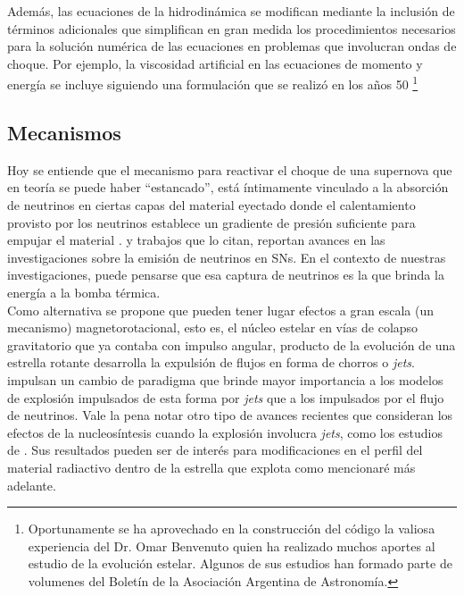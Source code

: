 \documentclass[baaa]{baaa}
\begin{document}
Además, las ecuaciones de la hidrodinámica se modifican mediante la inclusión de términos adicionales que simplifican en gran medida los procedimientos necesarios para la solución numérica de las ecuaciones en problemas que involucran ondas de choque. Por ejemplo, la viscosidad artificial en las ecuaciones de momento y energía se incluye siguiendo una formulación que se realizó en los años 50 \footnote{Oportunamente se ha aprovechado en la construcción del código la valiosa experiencia del Dr. Omar Benvenuto quien ha realizado muchos aportes al estudio de la evolución estelar. Algunos de sus estudios han formado parte de volumenes del Boletín de la Asociación Argentina de Astronomía.}


\subsection{Mecanismos}\label{mech}

Hoy se entiende que el mecanismo para reactivar el choque de una supernova que en teoría se puede haber ``estancado'', está íntimamente vinculado a la absorción de neutrinos en ciertas capas del material eyectado donde el calentamiento provisto por los neutrinos establece un gradiente de presión suficiente para empujar el material \citep{Bethe}. 
\cite{2013ApJS..205....2N} y trabajos que lo citan, reportan avances en las investigaciones sobre la emisión de neutrinos en SNs. En el contexto de nuestras investigaciones, puede pensarse que esa captura de neutrinos es la que brinda la energía a la bomba térmica.\\

Como alternativa se propone que pueden tener lugar efectos a gran escala (un mecanismo) magnetorotacional, esto es, el núcleo estelar en vías de colapso gravitatorio que ya contaba con impulso angular, producto de la evolución de una estrella rotante \citep{2009Maeder} desarrolla la expulsión de flujos en forma de chorros o {\em jets}. 
\cite{2017Bear} impulsan un cambio de paradigma que brinde mayor importancia a los modelos de explosión impulsados de esta forma por {\em jets} que a los impulsados por el flujo de neutrinos. 
Vale la pena notar otro tipo de avances recientes que consideran los efectos de la nucleosíntesis cuando la explosión involucra {\em jets}, como los estudios de \cite{2023Ober}. Sus resultados pueden ser de interés para modificaciones en el perfil del material radiactivo dentro de la estrella que explota como mencionaré más adelante.\\
\end{document}

